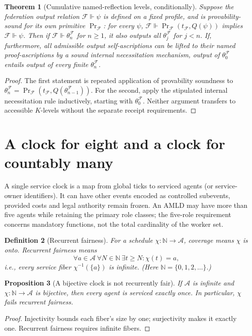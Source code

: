 \documentclass[10pt,letterpaper]{article}
\newtheorem{definition}{Definition}[section]
\newtheorem{theorem}[definition]{Theorem}
\newtheorem{proposition}[definition]{Proposition}
\theoremstyle{remark}\newtheorem{remark}[definition]{Remark}
\newcommand{\F}{\mathcal{F}}
\newcommand{\Ag}{\mathcal{A}}
\newcommand{\Prf}{\operatorname{Pr}}
\newcommand{\N}{\mathbb{N}}
\begin{document}
\begin{theorem}[Cumulative named-reflection levels, conditionally]
Suppose the federation output relation $\F\Vdash\psi$ is defined on a fixed profile, and is provability-sound for its own primitive $\Prf_{\F}$: for every $\psi$, $\F\Vdash\Prf_{\F}(t_{\F},Q(\psi))$ implies $\F\Vdash\psi$. Then if $\F\Vdash\theta_n^{\F}$ for $n\ge1$, it also outputs all $\theta_j^{\F}$ for $j<n$. If, furthermore, all admissible output self-ascriptions can be lifted to their named proof-ascriptions by a sound internal necessitation mechanism, output of $\theta_0^{\F}$ entails output of every finite $\theta_n^{\F}$.
\end{theorem}
\begin{proof}
The first statement is repeated application of provability soundness to $\theta_n^{\F}=\Prf_{\F}(t_{\F},Q(\theta_{n-1}^{\F}))$. For the second, apply the stipulated internal necessitation rule inductively, starting with $\theta_0^{\F}$. Neither argument transfers to accessible $K$-levels without the separate receipt requirements.
\end{proof}

\section{A clock for eight and a clock for countably many}
A single service clock is a map from global ticks to serviced agents (or service-owner identifiers). It can have other events encoded as controlled subevents, provided costs and legal authority remain frozen. An AMLD may have more than five agents while retaining the primary role classes; the five-role requirement concerns mandatory functions, not the total cardinality of the worker set.

\begin{definition}[Recurrent fairness]
For a schedule $\chi:\N\to\Ag$, \emph{coverage} means $\chi$ is onto. \emph{Recurrent fairness} means
\[
\forall a\in\Ag\ \forall N\in\N\ \exists t\ge N:\chi(t)=a,
\]
i.e., every service fiber $\chi^{-1}(\{a\})$ is infinite. (Here $\N=\{0,1,2,\ldots\}$.)
\end{definition}

\begin{proposition}[A bijective clock is not recurrently fair]
If $\Ag$ is infinite and $\chi:\N\to\Ag$ is bijective, then every agent is serviced exactly once. In particular, $\chi$ fails recurrent fairness.
\end{proposition}
\begin{proof}
Injectivity bounds each fiber's size by one; surjectivity makes it exactly one. Recurrent fairness requires infinite fibers.
\end{proof}
\end{document}
